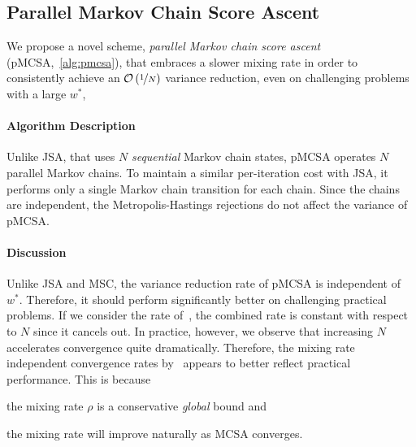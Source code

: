 \subsection{Parallel Markov Chain Score Ascent}
We propose a novel scheme, \textit{parallel Markov chain score ascent} (pMCSA,~\cref{alg:pmcsa}), that embraces a slower mixing rate in order to consistently achieve an \(\mathcal{O}\left(\nicefrac{1}{N}\right)\) variance reduction, even on challenging problems with a large \(w^*\),  


\vspace{-0.1in}
\paragraph{Algorithm Description}
Unlike JSA, that uses \(N\) \textit{sequential} Markov chain states, pMCSA operates \(N\) parallel Markov chains.
To maintain a similar per-iteration cost with JSA, it performs only a single Markov chain transition for each chain.
Since the chains are independent, the Metropolis-Hastings rejections do not affect the variance of pMCSA.

\newpage



\vspace{-0.1in}
\paragraph{Discussion}
Unlike JSA and MSC, the variance reduction rate of pMCSA is independent of \(w^*\).
Therefore, it should perform significantly better on challenging practical problems.
If we consider the rate of~\citet{duchi_ergodic_2012}, the combined rate is constant with respect to \(N\) since it cancels out.
In practice, however, we observe that increasing \(N\) accelerates convergence quite dramatically.
Therefore, the mixing rate independent convergence rates by~\citet{doan_finitetime_2020, doan_convergence_2020} appears to better reflect practical performance.
This is because
\begin{enumerate*}[label=\textbf{(\roman*)}]
  \item the mixing rate \(\rho\) is a conservative \textit{global} bound and 
  \item the mixing rate will improve naturally as MCSA converges.
\end{enumerate*}

